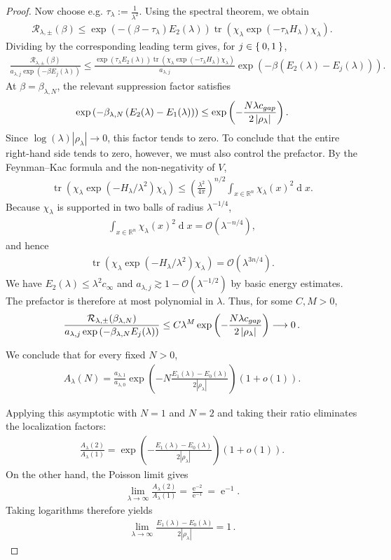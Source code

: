 \documentclass[10pt,a4paper]{amsart}
\newcommand{\Ord}[1]{\calO\left(#1\right)}
\newcommand{\RR}{\mathbb{R}}
\newcommand{\abs}[1]{\left\lvert#1\right\rvert}
\newcommand{\br}[1]{\left(#1\right)}
\newcommand{\calO}{\mathcal{O}}
\newcommand{\calR}{\mathcal{R}}
\newcommand{\dif}{\operatorname{d}\!} %
\newcommand{\ee}{\operatorname{e}}
\newcommand{\eq}[1]{\begin{align*}#1\end{align*}}
\newcommand{\tr}{\operatorname{tr}}
\begin{document}
\begin{proof}
Now choose e.g.
$\tau_\lambda:=\frac{1}{\lambda^2}$.
Using the spectral theorem, we obtain
\eq{
\calR_{\lambda,\pm}(\beta)
\leq
\exp\br{
-\br{\beta-\tau_\lambda}E_2(\lambda)
}
\tr\br{
\chi_\lambda
\exp\br{-\tau_\lambda H_\lambda}
\chi_\lambda
}.
}
Dividing by the corresponding leading term gives, for
$j\in\Set{0,1}$,
\eq{
\frac{
\calR_{\lambda,\pm}(\beta)
}{
a_{\lambda,j}\exp\br{-\beta E_j(\lambda)}
}
\leq
\frac{
\exp\br{\tau_\lambda E_2(\lambda)}
\tr\br{
\chi_\lambda
\exp\br{-\tau_\lambda H_\lambda}
\chi_\lambda
}
}{
a_{\lambda,j}
}
\exp\br{
-\beta\br{E_2(\lambda)-E_j(\lambda)}
}.
}
At $\beta=\beta_{\lambda,N}$, the relevant suppression factor satisfies
\eq{
\exp\br{
-\beta_{\lambda,N}
\br{E_2(\lambda)-E_1(\lambda)}
}
\leq
\exp\br{
-\frac{N \lambda c_{\rm gap}}{2\abs{\rho_\lambda}}
}.
}
Since $\log(\lambda)\abs{\rho_\lambda}\to0$, this factor tends to zero. To conclude that
the entire right-hand side tends to zero, however, we must also
control the prefactor. By the Feynman--Kac formula and the non-negativity of $V$,
\eq{
\tr\br{
\chi_\lambda
\exp\br{-H_\lambda/\lambda^2}
\chi_\lambda
}
\leq
\br{\frac{\lambda^2}{4\pi}}^{n/2}
\int_{x\in\RR^n}\chi_\lambda(x)^2\dif{x}.
}
Because $\chi_\lambda$ is supported in two balls of radius
$\lambda^{-1/4}$,
\eq{
\int_{x\in\RR^n}\chi_\lambda(x)^2\dif{x}
=
\Ord{\lambda^{-n/4}},
}
and hence
\eq{
\tr\br{
\chi_\lambda
\exp\br{-H_\lambda/\lambda^2}
\chi_\lambda
}
=
\Ord{\lambda^{3n/4}}.
}
We have $E_2(\lambda)\leq\lambda^2 c_{\infty}$ and
$a_{\lambda,j}\gtrsim1-\calO(\lambda^{-1/2})$ by basic energy estimates. The prefactor is therefore at most
polynomial in $\lambda$. Thus, for some $C,M>0$,
\eq{
\frac{
\calR_{\lambda,\pm}(\beta_{\lambda,N})
}{
a_{\lambda,j}
\exp\br{-\beta_{\lambda,N}E_j(\lambda)}
}
\leq
C\lambda^M
\exp\br{
-\frac{N \lambda c_{\rm gap}}{2\abs{\rho_\lambda}}
}
\longrightarrow0\,.
}

We conclude that for every fixed
$N>0$,
\eq{
A_\lambda(N)
=
\frac{a_{\lambda,1}}{a_{\lambda,0}}
\exp\br{
-N\frac{E_1(\lambda)-E_0(\lambda)}
        {2\abs{\rho_\lambda}}
}
\br{1+o(1)}.
}

Applying this asymptotic with $N=1$ and $N=2$ and taking
their ratio eliminates the localization factors:
\eq{
\frac{A_\lambda(2)}{A_\lambda(1)}
=
\exp\br{
-\frac{E_1(\lambda)-E_0(\lambda)}
       {2\abs{\rho_\lambda}}
}
\br{1+o(1)}.
}
On the other hand, the Poisson limit gives
\eq{
\lim_{\lambda\to\infty}
\frac{A_\lambda(2)}{A_\lambda(1)}
=
\frac{\ee^{-2}}{\ee^{-1}}
=
\ee^{-1}.
}
Taking logarithms therefore yields
\eq{
\lim_{\lambda\to\infty}
\frac{E_1(\lambda)-E_0(\lambda)}
     {2\abs{\rho_\lambda}}
=
1\,.
}
\end{proof}
\end{document}
